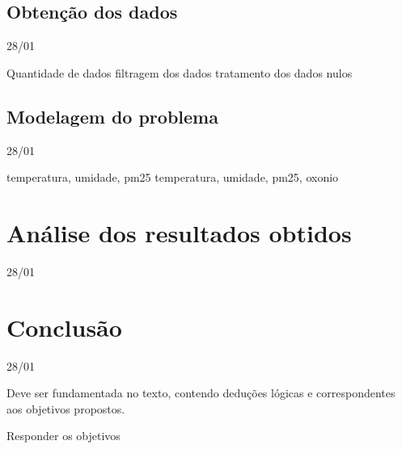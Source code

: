 \documentclass[
  12pt,		%
  a4paper,	%
  openright,%
  oneside,	%
  chapter=TITLE,		%
  section=TITLE,		%
  english,	%
  french,	%
  spanish,	%
  brazil	%
]{abntex2}
\begin{document}
    \section{Obtenção dos dados}
    28/01

    Quantidade de dados
    filtragem dos dados
    tratamento dos dados nulos
    \section{Modelagem do problema}
    28/01

    temperatura, umidade, pm25
    temperatura, umidade, pm25, oxonio
    \chapter{Análise dos resultados obtidos}
    28/01

    \chapter{Conclusão}
    28/01
    
        Deve ser fundamentada no texto, contendo deduções lógicas e correspondentes aos objetivos propostos.
        
        Responder os objetivos
    
    \postextual
    
    
    
    
    
\end{document}
